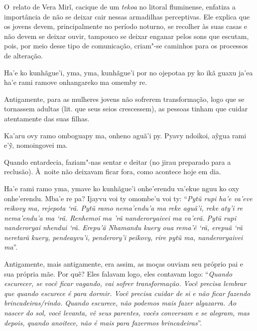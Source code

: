 O~relato de Vera Mirĩ, cacique de um \emph{tekoa} no litoral fluminense,
enfatiza a importância de não se deixar cair nessas armadilhas
perceptivas. Ele explica que os jovens devem, principalmente no período
noturno, se recolher às suas casas e não devem se deixar ouvir,
tampouco se deixar enganar pelos sons que escutam, pois, por meio desse
tipo de comunicação, criam"-se caminhos para os processos de alteração.

\bigskip

\begin{paracol}{2}
\footnotesize
\vspace*{0.4cm}

\noindent
Ha’e ko kunhãgue’i, yma, yma, kunhãgue’i por no ojepotaa py ko ikã guaxu
ja’ea ha’e rami ramove onhangareko ma omemby re. 

\bigskip

\switchcolumn
\noindent
Antigamente, para as mulheres jovens não sofrerem transformação, logo
que se tornassem adultas (lit. que seus seios crescessem), as pessoas
tinham que cuidar atentamente das suas filhas. 

\smallskip

\switchcolumn
\medskip
\noindent
Ka'aru ovy ramo omboguapy ma, onheno aguã'i py. Pyavy ndoikoi, aỹgua
rami e'ỹ, nomoingovei ma. 

\bigskip

\switchcolumn
\noindent
Quando entardecia, faziam"-nas sentar e deitar (no jirau preparado para a
reclusão). À~noite não deixavam ficar fora, como acontece hoje em dia. 

\smallskip

\switchcolumn
\medskip
\noindent
Ha'e rami ramo yma, ymave ko kunhãgue'i onhe'erendu va'ekue nguu ko oxy
onhe'erendu. Mba'e re pa? Ijayvu voi ty omombe'u voi ty: ``\emph{Pytũ
rupi ha'e va'eve reikovy ma, rejepota `rã. Pytũ ramo nema'endu'a ma reke
aguã'i, reke aty'i re nema'endu'a ma `rã. Renhemoĩ ma 'rã nanderoryaivei
ma va'erã. Pytũ rupi nanderoryai nhendui `rã. Erepu'ã Nhamandu kuery oua
rema'ẽ `rã, erepuã `rã neretarã kuery, pendeayvu'i, penderory'i peikovy,
rire pytũ ma, nanderoryaivei ma}''. 

\bigskip

\switchcolumn
\noindent
Antigamente, mais antigamente, era assim, as moças ouviam seu próprio
pai e sua própria mãe. Por quê? Eles falavam logo, eles contavam logo:
``\emph{Quando escurecer, se você ficar vagando, vai sofrer
transformação. Você precisa lembrar que quando escurece é para dormir.
Você precisa cuidar de si e não ficar fazendo brincadeiras/rindo. Quando
escurece, não podemos mais fazer algazarra. Ao nascer do sol, você
levanta, vê seus parentes, vocês conversam e se alegram, mas depois,
quando anoitece, não é mais para fazermos brincadeiras}''.


\end{paracol}
